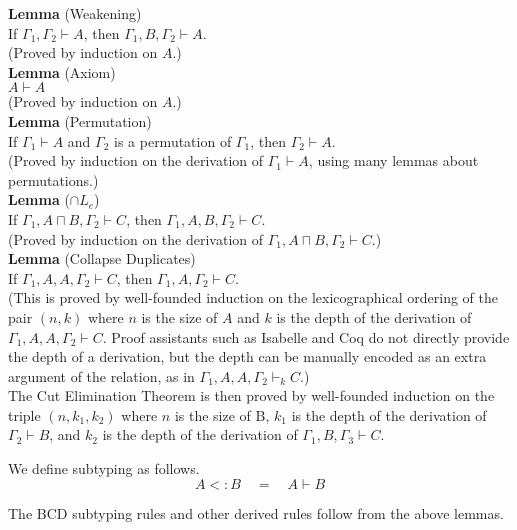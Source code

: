 \documentclass{article}
\begin{document}
\noindent \textbf{Lemma} (Weakening)\\
  If $\Gamma_1,\Gamma_2 \vdash A$,
  then $\Gamma_1,B,\Gamma_2 \vdash A$. \\
  (Proved by induction on $A$.) \\

\noindent \textbf{Lemma} (Axiom)\\
$A \vdash A$ \\
  (Proved by induction on $A$.)\\

\noindent \textbf{Lemma} (Permutation)\\
  If $\Gamma_1 \vdash A$ and $\Gamma_2$ is a permutation of $\Gamma_1$,
  then $\Gamma_2 \vdash A$. \\
  (Proved by induction on the derivation of $\Gamma_1 \vdash A$,
   using many lemmas about permutations.)\\
  
\noindent \textbf{Lemma} ($\cap L_e$) \\
If $\Gamma_1,A\sqcap B,\Gamma_2 \vdash C$, then
$\Gamma_1,A, B,\Gamma_2 \vdash C$. \\
(Proved by induction on the derivation of $\Gamma_1,A\sqcap B,\Gamma_2
\vdash C$.)\\

\noindent \textbf{Lemma} (Collapse Duplicates) \\
%
If $\Gamma_1,A,A,\Gamma_2 \vdash C$, then $\Gamma_1,A,\Gamma_2 \vdash
C$. \\
%
(This is proved by well-founded induction on the lexicographical
ordering of the pair $(n,k)$ where $n$ is the size of $A$ and $k$ is
the depth of the derivation of $\Gamma_1,A,A,\Gamma_2 \vdash C$. Proof
assistants such as Isabelle and Coq do not directly provide the depth
of a derivation, but the depth can be manually encoded as an extra
argument of the relation, as in $\Gamma_1,A,A,\Gamma_2 \vdash_k C$.) \\

The Cut Elimination Theorem is then proved by well-founded induction
on the triple $(n,k_1,k_2)$ where $n$ is the size of B, $k_1$ is the
depth of the derivation of $\Gamma_2 \vdash B$, and $k_2$ is the depth
of the derivation of $\Gamma_1,B,\Gamma_3 \vdash C$.

We define subtyping as follows.
\[
  A <: B \quad = \quad A \vdash B
\]

The BCD subtyping rules and other derived rules follow from the above
lemmas.\\
\end{document}
